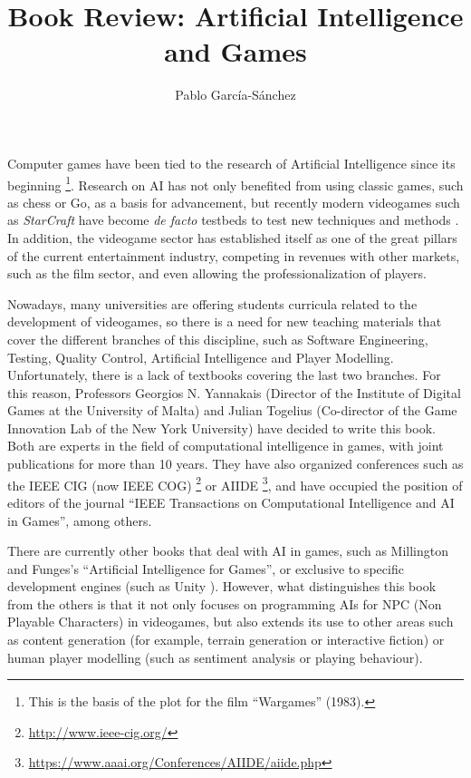 \documentclass{article}
\begin{document}
\title{Book Review: Artificial Intelligence and Games}
\author{Pablo Garc\'ia-S\'anchez}

\maketitle

Computer games have been tied to the research of Artificial Intelligence since its beginning \footnote{This is the basis of the plot for the film ``Wargames'' (1983).}.  Research on AI has not only benefited from using classic games, such as chess or Go, as a basis for advancement, but recently modern videogames such as {\em StarCraft} have become {\em de facto} testbeds to test new techniques and methods \cite{Ontanon13Survey}. In addition, the videogame sector has established itself as one of the great pillars of the current entertainment industry, competing in revenues with other markets, such as the film sector, and even allowing the professionalization of players.

Nowadays, many universities are offering students curricula related to the development of videogames, so there is a need for new teaching materials that cover the different branches of this discipline, such as Software Engineering, Testing, Quality Control, Artificial Intelligence and Player Modelling. Unfortunately, there is a lack of textbooks covering the last two branches.  For this reason, Professors Georgios N. Yannakais (Director of the Institute of Digital Games at the University of Malta) and Julian Togelius (Co-director of the Game Innovation Lab of the New York University) have decided to write this book. Both are experts in the field of computational intelligence in games, with joint publications for more than 10 years. They have also organized conferences such as the IEEE CIG (now IEEE COG) \footnote{\url{http://www.ieee-cig.org/}} or AIIDE \footnote{\url{https://www.aaai.org/Conferences/AIIDE/aiide.php}}, and have occupied the position of editors of the journal  ``IEEE Transactions on Computational Intelligence and AI in Games'', among others.

There are currently other books that deal with AI in games, such as Millington and Funges's ``Artificial Intelligence for Games''\cite{millington09artificial}, or exclusive to specific development engines (such as Unity \cite{unity17}). However, what distinguishes this book from the others is that it not only focuses on programming AIs for NPC (Non Playable Characters) in videogames, but also extends its use to other areas such as content generation (for example, terrain generation or interactive fiction) or human player modelling (such as sentiment analysis or playing behaviour).
\end{document}
